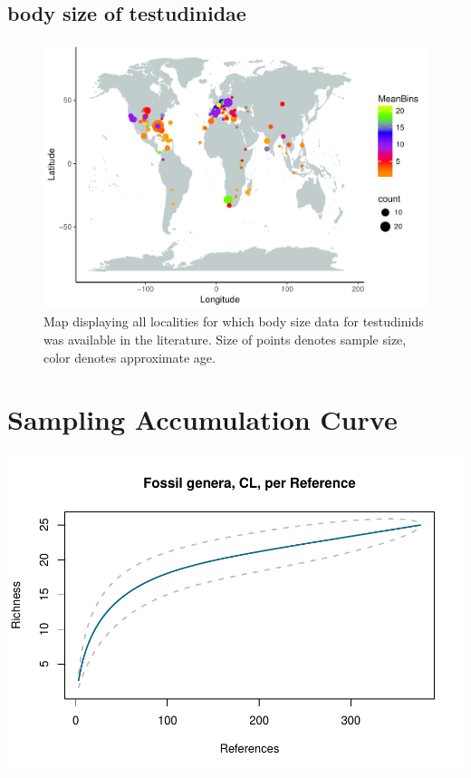 \documentclass[]{article}
\begin{document}
\newpage

\subsection{body size of testudinidae}\label{body-size-of-testudinidae}

\begin{figure}[htbp]
\centering
\includegraphics{MA_JJ_files/figure-latex/Map body size data set-1.pdf}
\caption{Map displaying all localities for which body size data for
testudinids was available in the literature. Size of points denotes
sample size, color denotes approximate age.}
\end{figure}

\newpage

\section{Sampling Accumulation Curve}\label{sampling-accumulation-curve}

\includegraphics{MA_JJ_files/figure-latex/Species Accumulation Curve with Genera-1.pdf}
\newpage
\end{document}
